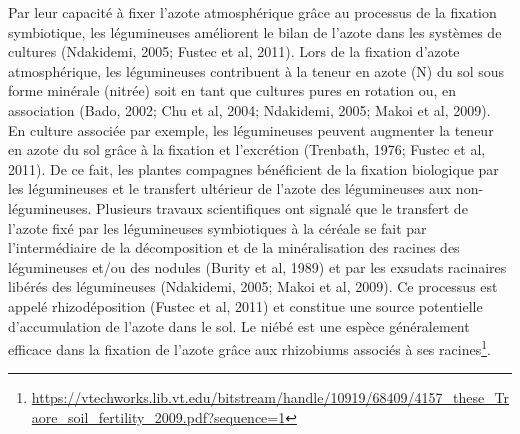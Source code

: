 \documentclass[a4paper,11pt]{article}
\begin{document}
Par leur capacité à fixer l’azote atmosphérique grâce au processus de
la fixation symbiotique, les légumineuses améliorent le bilan de
l'azote dans les systèmes de cultures (Ndakidemi, 2005; Fustec et al,
2011)\cite{Ndakidemi_2005}. Lors de la fixation d’azote atmosphérique, les légumineuses
contribuent à la teneur en azote (N) du sol sous forme minérale
(nitrée) soit en tant que cultures pures en rotation ou, en
association (Bado, 2002; Chu et al, 2004; Ndakidemi, 2005; Makoi et
al, 2009). En culture associée par exemple, les légumineuses peuvent
augmenter la teneur en azote du sol grâce à la fixation et l’excrétion
(Trenbath, 1976; Fustec et al, 2011). De ce fait, les plantes
compagnes bénéficient de la fixation biologique par les légumineuses
et le transfert ultérieur de l’azote des légumineuses aux
non-légumineuses. Plusieurs travaux scientifiques ont signalé que le
transfert de l’azote fixé par les légumineuses symbiotiques à la
céréale se fait par l’intermédiaire de la décomposition et de la
minéralisation des racines des légumineuses et/ou des nodules (Burity
et al, 1989) et par les exsudats racinaires libérés des légumineuses
\cite{Ndakidemi_2005} (Ndakidemi, 2005; Makoi et al, 2009).
Ce processus est appelé rhizodéposition (Fustec et al, 2011)\cite{Fustec_2009} et constitue
une source potentielle d’accumulation de l’azote dans le
sol\cite{Koulibi_FideleZONGO}.  Le niébé est une espèce généralement
efficace dans la fixation de l’azote grâce aux rhizobiums associés à
ses racines\footnote{\url{https://vtechworks.lib.vt.edu/bitstream/handle/10919/68409/4157_these_Traore_soil_fertility_2009.pdf?sequence=1}}.

\newpage

 
  
\end{document}
